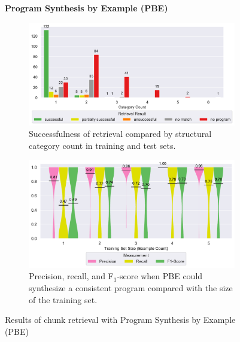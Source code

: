 \begin{figure}
\centering
    \textbf{Program Synthesis by Example (PBE)}\par\medskip
\begin{subfigure}[b]{\columnwidth}
		\centering
		\includegraphics[width=\columnwidth,
		clip]{img/big-study/failure-reason-categorycount-PBE.pdf}
				\caption{Successfulness of retrieval
				compared by structural category count
				in training and test sets.}
		\label{fig:failure-reason-categorycount-PBE}
\end{subfigure}\hspace{\fill}
\begin{subfigure}[b]{\columnwidth}
		\centering
		\includegraphics[width=\columnwidth,
		clip]{img/big-study/recall-precision-examplecount-sythesisworked-PBE.pdf}
				\caption{Precision, recall, and
				F$_{1}$-score when PBE could synthesize
				a consistent program compared with the
				size of the training set.}
		\label{fig:recall-precision-examplecount-sythesisworked-PBE}
\end{subfigure}
\caption{Results of chunk retrieval with  Program Synthesis by Example
(PBE)}
\end{figure}

